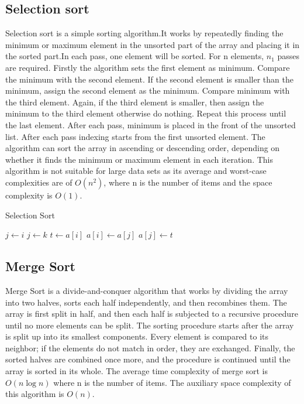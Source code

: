 \documentclass[twocolumn]{article}
\begin{document}
\subsection*{Selection sort}
Selection sort is a simple sorting algorithm.It works by repeatedly finding the minimum or maximum element in the unsorted part of the array and placing it in the sorted part.In each pass, one element will be sorted. For n elements, $n_1$ passes are required.
Firstly the algorithm sets the first element as minimum. Compare the minimum with the second element. If the second element is smaller than the minimum, assign the second element as the minimum. Compare minimum with the third element. Again, if the third element is smaller, then assign the minimum to the third element otherwise do nothing. Repeat this process until the last element. After each pass, minimum is placed in the front of the unsorted list. After each pass indexing starts from the first unsorted element. The algorithm can sort the array in ascending or descending order, depending on whether it finds the minimum or maximum element in each iteration\cite{programiz-selection-sort}.
This algorithm is not suitable for large data sets as its average and worst-case complexities are of $O(n^2)$, where n is the number of items and the space complexity is $O(1)$\cite{tutorialspoint-selection-sort}.

\begin{algorithm}
    \caption{Selection Sort}
    \begin{algorithmic}[1]
        \State $j \gets i$
        \State $j \gets k$
        \EndIf
        \EndFor
        \State $t \gets a[i]$
        \State $a[i] \gets a[j]$
        \State $a[j] \gets t$
        \EndFor
        \EndProcedure
    \end{algorithmic}
\end{algorithm}

\subsection*{Merge Sort}
Merge Sort is a divide-and-conquer algorithm that works by dividing the array into two halves, sorts each half independently, and then recombines them. The array is first split in half, and then each half is subjected to a recursive procedure until no more elements can be split. The sorting procedure starts after the array is split up into its smallest components. Every element is compared to its neighbor; if the elements do not match in order, they are exchanged. Finally, the sorted halves are combined once more, and the procedure is continued until the array is sorted in its whole. The average time complexity of merge sort is $O(n \log {n})$ where n is the number of items\cite{horowitz1998computer}. The auxiliary space complexity of this algorithm is $O(n)$\cite{geeksforgeeks-merge-sort}.
\end{document}
